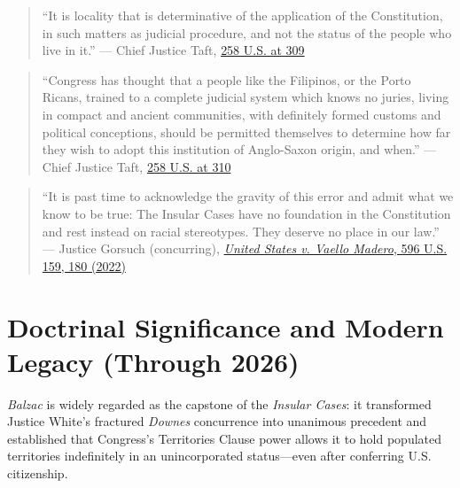 \documentclass[12pt]{article}
\begin{document}
\begin{quote}
``It is locality that is determinative of the application of the Constitution, in such matters as judicial procedure, and not the status of the people who live in it.'' --- Chief Justice Taft, \href{https://supreme.justia.com/cases/federal/us/258/298/}{258 U.S. at 309}
\end{quote}

\begin{quote}
``Congress has thought that a people like the Filipinos, or the Porto Ricans, trained to a complete judicial system which knows no juries, living in compact and ancient communities, with definitely formed customs and political conceptions, should be permitted themselves to determine how far they wish to adopt this institution of Anglo-Saxon origin, and when.'' --- Chief Justice Taft, \href{https://en.wikisource.org/wiki/Balzac_v._Porto_Rico/Opinion_of_the_Court}{258 U.S. at 310}
\end{quote}

\begin{quote}
``It is past time to acknowledge the gravity of this error and admit what we know to be true: The Insular Cases have no foundation in the Constitution and rest instead on racial stereotypes. They deserve no place in our law.'' --- Justice Gorsuch (concurring), \href{https://supreme.justia.com/cases/federal/us/596/20-303/}{\textit{United States v. Vaello Madero}, 596 U.S. 159, 180 (2022)}
\end{quote}

\section{Doctrinal Significance and Modern Legacy (Through 2026)}
\textit{Balzac} is widely regarded as the capstone of the \textit{Insular Cases}: it transformed Justice White's fractured \textit{Downes} concurrence into unanimous precedent and established that Congress's Territories Clause power allows it to hold populated territories indefinitely in an unincorporated status---even after conferring U.S. citizenship.
\end{document}
